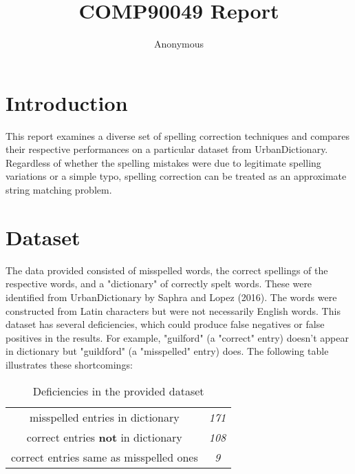 \documentclass[11pt]{article}
\title{COMP90049 Report}
\author
{Anonymous}
\begin{document}
\maketitle



\section{Introduction}

This report examines a diverse set of spelling correction techniques and compares their respective performances on a particular dataset from UrbanDictionary. %
Regardless of whether the spelling mistakes were due to legitimate spelling variations or a simple typo, spelling correction can be treated as an approximate string matching problem. %



\section{Dataset}
The data provided consisted of misspelled words, the correct spellings of the respective words, and a "dictionary" of correctly spelt words. These were identified from UrbanDictionary by Saphra and Lopez (2016). The words were constructed from Latin characters but were not necessarily English words. This dataset has several deficiencies, which could produce false negatives or false positives in the results. For example, "guilford" (a "correct" entry) doesn't appear in dictionary but "guildford" (a "misspelled" entry) does. The following table illustrates these shortcomings:


\begin{table}[h]
\begin{center}
\begin{tabular}{|c|c|}

\hline
misspelled entries in dictionary & \textit{171}  \\ 
correct entries \textbf{not} in dictionary & \textit{108} \\ 
correct entries same as misspelled ones & \textit{9} \\
\hline

\end{tabular}
\caption{Deficiencies in the provided dataset}\label{table1}
 \end{center}
\end{table}
\end{document}
